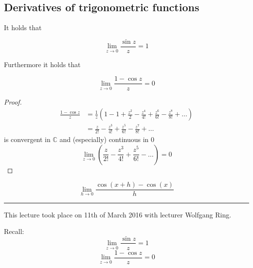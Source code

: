 \documentclass[a4paper,landscape,twocolumn]{article}
\theoremstyle{definition}
\newcommand\meta[3]{\hrule{} This #1 took place on #2 with lecturer #3.\par}
\begin{document}
\subsection{Derivatives of trigonometric functions}
%
It holds that
\begin{mdframed}
  \[ \lim_{z \to 0} \frac{\sin{z}}{z} = 1 \]
\end{mdframed}
Furthermore it holds that
\begin{mdframed}
  \[ \lim_{z \to 0} \frac{1 - \cos{z}}{z} = 0 \]
\end{mdframed}

\begin{proof}
  \begin{align*}
    \frac{1 - \cos{z}}{z}
      &= \frac1z \left(1 - 1 + \frac{z^2}{2} - \frac{z^4}{4!} + \frac{z^6}{6!} - \frac{z^8}{8!} + \ldots\right) \\
      &= \frac{z}{2!} - \frac{z^3}{4!} + \frac{z^5}{6!} - \frac{z^7}{8!} + \ldots
  \end{align*}
  is convergent in $\mathbb C$ and (especially) continuous in $0$
  \[ \lim_{z \to 0} \left(\frac{z}{2!} - \frac{z^3}{4!} + \frac{z^5}{6!} - \ldots\right) = 0 \]
\end{proof}

\[
  \lim_{h\to0} \frac{\cos(x + h) - \cos(x)}{h}
\]

\meta{lecture}{11th of March 2016}{Wolfgang Ring}

Recall:
\[ \lim_{z\to0} \frac{\sin{z}}{z} = 1 \]
\[ \lim_{z\to0} \frac{1-\cos{z}}{z} = 0 \]
\end{document}
